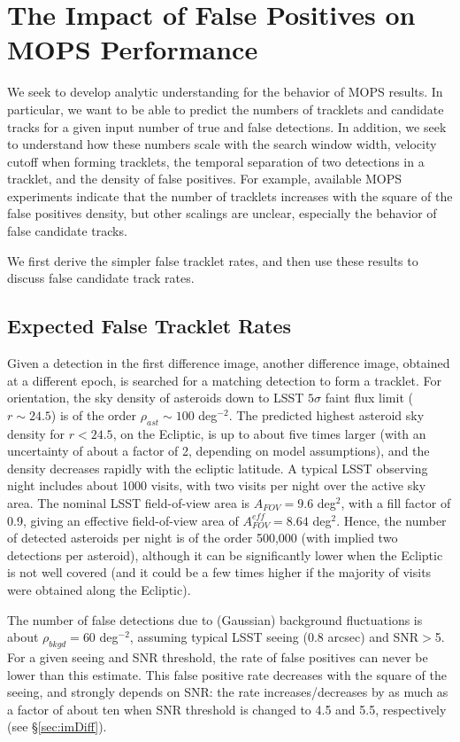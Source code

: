 \section{The Impact of False Positives on MOPS Performance \label{sec:appMOPS}}


We seek to develop analytic understanding for the behavior of MOPS results.
In particular, we want to be able to predict the numbers of tracklets and
candidate tracks for a given input number of true and false detections. In addition, we seek
to understand how these numbers scale with the search window width,
velocity cutoff when forming tracklets, the temporal separation of two
detections in a tracklet, and the density of false positives. For example, available
MOPS experiments indicate that the number of tracklets increases with
the square of the false positives density, but other scalings are unclear,
especially the behavior of false candidate tracks.

We first derive the simpler false tracklet rates, and then use these results to
discuss false candidate track rates.


\subsection{Expected False Tracklet Rates \label{sec:tracklets} }

Given a detection in the first difference image,  another difference image, obtained at a different epoch,
is searched for a matching detection to form a tracklet. For orientation,
the sky density of asteroids down to LSST $5\sigma$ faint flux limit ($r \sim 24.5$) is of the order
$\rho_{ast} \sim 100$ deg$^{-2}$. The predicted highest asteroid sky density for $r<24.5$,
on the Ecliptic, is up to about five times larger (with an uncertainty of about a factor of 2,
depending on model assumptions), and the density decreases rapidly with the ecliptic latitude.
A typical LSST observing night includes about 1000 visits, with two visits per night over
the active sky area. The nominal LSST field-of-view area is $A_{FOV}=9.6$ deg$^2$, with a
fill factor of 0.9, giving an effective field-of-view area of $A_{FOV}^{eff}=8.64$ deg$^2$. Hence,
the number of detected asteroids per night is of the order 500,000 (with implied two detections
per asteroid), although it can be significantly lower when the Ecliptic is not well covered (and
it could be a few times higher if the majority of visits were obtained along the Ecliptic).

The number of false detections due to (Gaussian) background fluctuations is
about $\rho_{bkgd} = 60$ deg$^{-2}$, assuming typical LSST seeing (0.8 arcsec)
and SNR$>$5. For a given seeing and SNR threshold, the rate of false positives can never be
lower than this estimate. This false positive rate decreases with the square of the seeing, and
strongly depends on SNR: the rate increases/decreases by as much as a factor of about ten
when SNR threshold is changed to 4.5 and 5.5, respectively (see \S\ref{sec:imDiff}).

